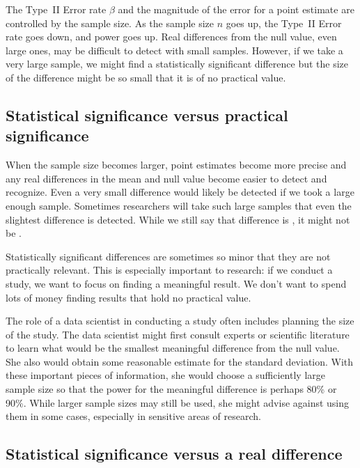 The Type~II Error rate $\beta$ and the magnitude of the error for a point estimate are controlled by the sample size. As the sample size $n$ goes up, the Type~II Error rate goes down, and power goes up. Real differences from the null value, even large ones, may be difficult to detect with small samples. However, if we take a very large sample, we might find a statistically significant difference but the size of the difference might be so small that it is of no practical value.





\subsection{Statistical significance versus practical significance}

When the sample size becomes larger, point estimates become more precise and any real differences in the mean and null value become easier to detect and recognize. Even a very small difference would likely be detected if we took a large enough sample. Sometimes researchers will take such large samples that even the slightest difference is detected. While we still say that difference is , it might not be .

Statistically significant differences are sometimes so minor that they are not practically relevant. This is especially important to research: if we conduct a study, we want to focus on finding a meaningful result. We don't want to spend lots of money finding results that hold no practical value.

The role of a data scientist in conducting a study often includes planning the size of the study. The data scientist might first consult experts or scientific literature to learn what would be the smallest meaningful difference from the null value. She also would obtain some reasonable estimate for the standard deviation. With these important pieces of information, she would choose a sufficiently large sample size so that the power for the meaningful difference is perhaps 80\% or 90\%. While larger sample sizes may still be used, she might advise against using them in some cases, especially in sensitive areas of research.

\subsection{Statistical significance versus a real difference}

